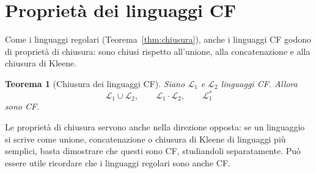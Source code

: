 \documentclass[a4paper, 11pt, oneside]{book}
\theoremstyle{formale}
\newtheorem{theorem}{Teorema}
\begin{document}
    \section{Propriet\`a dei linguaggi CF}
    \label{sec:proprieta-cf}
    Come i linguaggi regolari (Teorema~\ref{thm:chiusura}), anche i linguaggi CF godono
    di propriet\`a di chiusura: sono chiusi rispetto all'unione, alla concatenazione e
    alla chiusura di Kleene.

    \begin{theorem}[Chiusura dei linguaggi CF]
        \label{thm:chiusura-cf}
        Siano $\mathcal{L}_1$ e $\mathcal{L}_2$ linguaggi CF. Allora
        \begin{equation*}
            \mathcal{L}_1 \cup \mathcal{L}_2, \qquad
            \mathcal{L}_1 \cdot \mathcal{L}_2, \qquad
            \mathcal{L}_1^*
        \end{equation*}
        sono CF.
    \end{theorem}
    Le propriet\`a di chiusura servono anche nella direzione opposta: se un linguaggio
    si scrive come unione, concatenazione o chiusura di Kleene di linguaggi pi\`u
    semplici, basta dimostrare che questi sono CF, studiandoli
    separatamente. Pu\`o essere utile
    ricordare che i linguaggi regolari sono anche CF.
\end{document}
